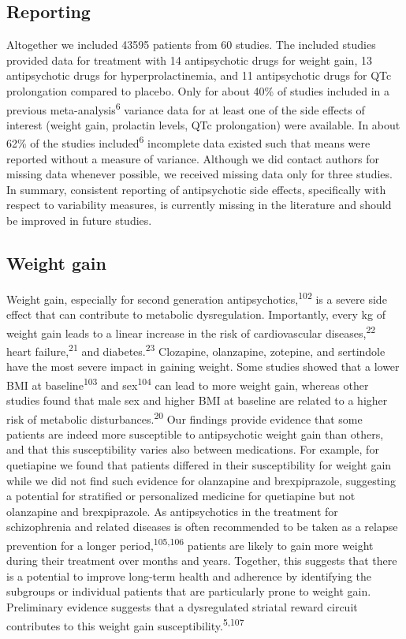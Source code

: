 \documentclass[
  9pt,
  english,
  ,jou,floatsintext]{apa6}
\begin{document}
\hypertarget{reporting}{%
\subsection{Reporting}\label{reporting}}

Altogether we included 43595 patients from 60
studies. The included studies provided data for treatment with 14
antipsychotic drugs for weight gain, 13 antipsychotic drugs
for hyperprolactinemia, and 11 antipsychotic drugs for
QTc prolongation compared to placebo. Only for about 40\% of studies
included in a previous meta-analysis\textsuperscript{6} variance data for at
least one of the side effects of interest (weight gain, prolactin
levels, QTc prolongation) were available. In about 62\% of the studies
included\textsuperscript{6} incomplete data existed such that means were reported
without a measure of variance. Although we did contact authors for missing
data whenever possible, we received missing data only for three studies.
In summary, consistent reporting of antipsychotic side effects,
specifically with respect to variability measures, is currently missing
in the literature and should be improved in future studies.

\hypertarget{weight-gain-1}{%
\subsection{Weight gain}\label{weight-gain-1}}

Weight gain, especially for second generation
antipsychotics,\textsuperscript{102} is a severe side effect that can
contribute to metabolic dysregulation. Importantly, every kg of weight
gain leads to a linear increase in the risk of cardiovascular
diseases,\textsuperscript{22} heart failure,\textsuperscript{21} and
diabetes.\textsuperscript{23} Clozapine, olanzapine, zotepine, and sertindole
have the most severe impact in gaining weight. Some studies showed
that a lower BMI at baseline\textsuperscript{103} and sex\textsuperscript{104} can
lead to more weight gain, whereas other studies found that male sex
and higher BMI at baseline are related to a higher risk of metabolic
disturbances.\textsuperscript{20} Our findings provide evidence that some
patients are indeed more susceptible to antipsychotic weight gain than
others, and that this susceptibility varies also between
medications. For example, for quetiapine we found that patients
differed in their susceptibility for weight gain while we did not find
such evidence for olanzapine and brexpiprazole, suggesting a potential
for stratified or personalized medicine for quetiapine but not
olanzapine and brexpiprazole. As antipsychotics in the treatment for
schizophrenia and related diseases is often recommended to be taken as
a relapse prevention for a longer period,\textsuperscript{105,106}
patients are likely to gain more weight during their treatment over
months and years. Together, this suggests that there is a potential to
improve long-term health and adherence by identifying the subgroups or
individual patients that are particularly prone to weight
gain. Preliminary evidence suggests that a dysregulated striatal
reward circuit contributes to this weight gain
susceptibility.\textsuperscript{5,107}
\end{document}
